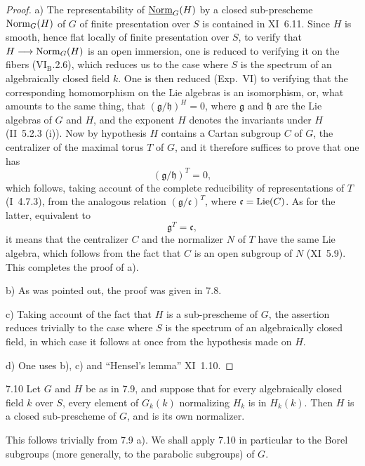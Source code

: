 \begin{proof}
a) The representability of $\underline{\mathrm{Norm}}_G(H)$ by a closed sub-prescheme $\operatorname{Norm}_G(H)$ of $G$ of finite presentation over $S$ is contained in XI~6.11. Since $H$ is smooth, hence flat locally of finite presentation over $S$, to verify that $H\longrightarrow\operatorname{Norm}_G(H)$ is an open immersion, one is reduced to verifying it on the fibers (VI$_{\mathrm B}$.2.6), which reduces us to the case where $S$ is the spectrum of an algebraically closed field $k$. One is then reduced (Exp.~VI) to verifying that the corresponding homomorphism on the Lie algebras is an isomorphism, or, what amounts to the same thing, that $(\mathfrak g/\mathfrak h)^H=0$, where $\mathfrak g$ and $\mathfrak h$ are the Lie algebras of $G$ and $H$, and the exponent $H$ denotes the invariants under $H$ (\cf II~5.2.3 (i)). Now by hypothesis $H$ contains a Cartan subgroup $C$ of $G$, the centralizer of the maximal torus $T$ of $G$, and it therefore suffices to prove that one has
\[
(\mathfrak g/\mathfrak h)^T=0,
\]
which follows, taking account of the complete reducibility of representations of $T$ (I~4.7.3), from the analogous relation $(\mathfrak g/\mathfrak c)^T$, where $\mathfrak c=\operatorname{Lie}(C)$. As for the latter, equivalent to
\[
\mathfrak g^T=\mathfrak c,
\]
it means that the centralizer $C$ and the normalizer $N$ of $T$ have the same Lie algebra, which follows from the fact that $C$ is an open subgroup of $N$ (XI~5.9). This completes the proof of a).

b) As was pointed out, the proof was given in 7.8.

c) Taking account of the fact that $H$ is a sub-prescheme of $G$, the assertion reduces trivially to the case where $S$ is the spectrum of an algebraically closed field, in which case it follows at once from the hypothesis made on $H$.

d) One uses b), c) and ``Hensel's lemma'' XI~1.10.
\end{proof}
\begin{corollary}{7.10}\label{XII.7.10}
Let $G$ and $H$ be as in 7.9, and suppose that for every algebraically closed field $k$ over $S$, every element of $G_k(k)$ normalizing $H_k$ is in $H_k(k)$. Then $H$ is a closed sub-prescheme of $G$, and is its own normalizer.
\end{corollary}
This follows trivially from 7.9 a). We shall apply 7.10 in particular to the Borel subgroups (more generally, to the parabolic subgroups) of $G$.
